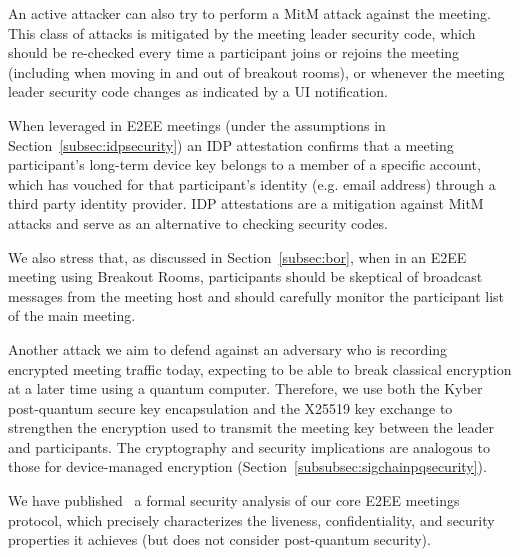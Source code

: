 An active attacker can also try to perform a MitM attack against the meeting. This class of attacks
is mitigated by the meeting leader security code, which should be re-checked every time a
participant joins or rejoins the meeting (including when moving in and out of breakout rooms), or
whenever the meeting leader security code changes as indicated by a UI notification.

When leveraged in E2EE meetings (under the assumptions in Section~\ref{subsec:idpsecurity}) an IDP
attestation confirms that a meeting participant's long-term device key belongs to a member of a
specific account, which has vouched for that participant's identity (e.g. email address) through a
third party identity provider. IDP attestations are a mitigation against MitM attacks and serve as
an alternative to checking security codes.

We also stress that, as discussed in Section~\ref{subsec:bor}, when in an E2EE meeting using
Breakout Rooms, participants should be skeptical of broadcast messages from the meeting host and
should carefully monitor the participant list of the main meeting.

Another attack we aim to defend against an adversary who is recording encrypted meeting traffic
today, expecting to be able to break classical encryption at a later time using a quantum computer.
Therefore, we use both the Kyber post-quantum secure key encapsulation and the X25519 key exchange
to strengthen the encryption used to transmit the meeting key between the leader and participants.
The cryptography and security implications are analogous to those for device-managed encryption
(Section~\ref{subsubsec:sigchainpqsecurity}).

We have published~\cite{eurocrypt-2023-32928} a formal security analysis of our core E2EE meetings
protocol, which precisely characterizes the liveness, confidentiality, and security properties it
achieves (but does not consider post-quantum security).

